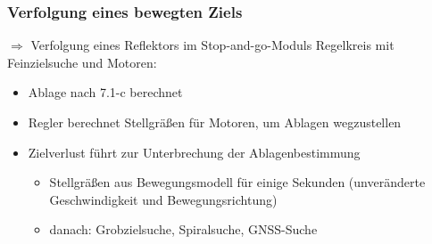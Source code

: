 \documentclass[12pt]{article}
\begin{document}
\subsubsection{Verfolgung eines bewegten Ziels}
$\Longrightarrow$ Verfolgung eines Reflektors im Stop-and-go-Moduls \newline
Regelkreis mit Feinzielsuche und Motoren:
\begin{figure}[ht]\centering
\end{figure}
\begin{itemize}
	\item Ablage nach 7.1-c berechnet
	\item Regler berechnet Stellgräßen für Motoren, um Ablagen wegzustellen
	\item Zielverlust führt zur Unterbrechung der Ablagenbestimmung
	\begin{itemize}
		\item Stellgräßen aus Bewegungsmodell für einige Sekunden (unveränderte Geschwindigkeit und Bewegungsrichtung)
		\item danach: Grobzielsuche, Spiralsuche, GNSS-Suche
	\end{itemize}
\end{itemize}
\end{document}
